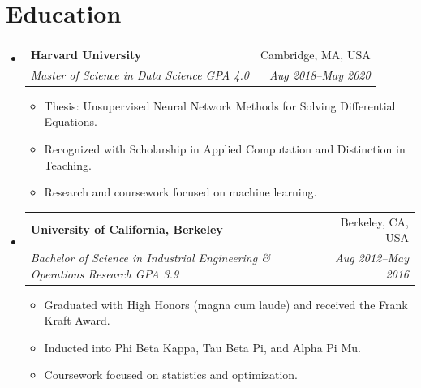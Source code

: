 \documentclass[a4paper,11pt]{article}
\makeatletter
\newcommand{\resumeItem}[1]{
  \item\small{#1}
}
\newcommand{\resumeItemListStart}{
  \begin{itemize}[rightmargin=0.11in, itemsep=1.5pt, topsep=4pt, parsep=0pt, partopsep=0pt]
}
\newcommand{\resumeItemListEnd}{\end{itemize}}
\newcommand{\resumeQuadHeading}[4]{
  \item
  \begin{tabular*}{0.96\textwidth}[t]{l@{\extracolsep{\fill}}r}
    \textbf{#1} & #2 \\
    \textit{\small#3} & \textit{\small #4} \\
  \end{tabular*}
}
\newcommand{\resumeHeadingListStart}{
  \begin{itemize}[leftmargin=0.15in, label={}]
}
\newcommand{\resumeHeadingListEnd}{\end{itemize}}
\makeatother
\begin{document}
\section{Education}
\resumeHeadingListStart
  \resumeQuadHeading{Harvard University}{Cambridge, MA, USA}{Master of Science in Data Science \textperiodcentered{} GPA 4.0}{Aug 2018--May 2020}
    \resumeItemListStart
      \resumeItem{Thesis: Unsupervised Neural Network Methods for Solving Differential Equations.}
      \resumeItem{Recognized with Scholarship in Applied Computation and Distinction in Teaching.}
      \resumeItem{Research and coursework focused on machine learning.}
    \resumeItemListEnd
  \resumeQuadHeading{University of California, Berkeley}{Berkeley, CA, USA}{Bachelor of Science in Industrial Engineering \& Operations Research \textperiodcentered{} GPA 3.9}{Aug 2012--May 2016}
    \resumeItemListStart
      \resumeItem{Graduated with High Honors (magna cum laude) and received the Frank Kraft Award.}
      \resumeItem{Inducted into Phi Beta Kappa, Tau Beta Pi, and Alpha Pi Mu.}
      \resumeItem{Coursework focused on statistics and optimization.}
    \resumeItemListEnd
\resumeHeadingListEnd

\newpage
\end{document}
